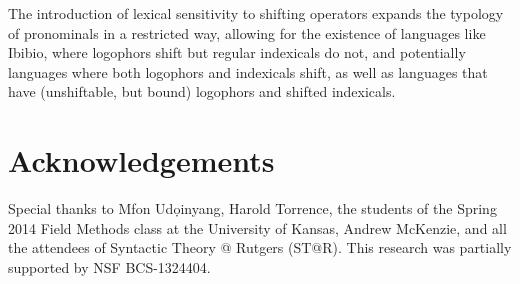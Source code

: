 \documentclass[output=paper]{langscibook}
\begin{document}
The introduction of lexical sensitivity to shifting operators expands the typology of  pronominals in a restricted way, allowing for the existence of languages like Ibibio, where logophors shift but regular indexicals do not, and potentially languages where both logophors and indexicals shift, as well as languages that have (unshiftable, but bound) logophors and shifted indexicals.


\section*{Acknowledgements}
Special thanks to Mfon Ud\d{o}inyang, Harold Torrence, the students of the Spring 2014 Field Methods class at the University of Kansas, Andrew McKenzie, and all the attendees of Syntactic Theory @ Rutgers (ST@R). This research was partially supported by NSF BCS-1324404.



{\sloppy \printbibliography[heading=subbibliography,notkeyword=this]}
\end{document}
